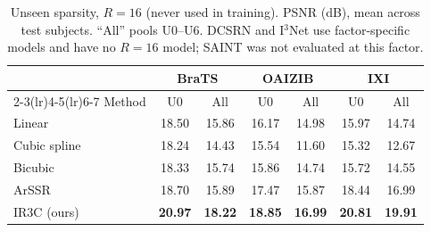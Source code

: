 \begin{table}[pos=t]
\caption{Unseen sparsity, $R=16$ (never used in training). PSNR (dB), mean across test subjects. ``All'' pools U0--U6. DCSRN and I$^3$Net use factor-specific models and have no $R=16$ model; SAINT was not evaluated at this factor.}
\label{tab:r16}
\footnotesize\setlength{\tabcolsep}{3pt}
\begin{tabular*}{\columnwidth}{@{\extracolsep{\fill}}lcccccc@{}}
\toprule
& \multicolumn{2}{c}{BraTS} & \multicolumn{2}{c}{OAIZIB} & \multicolumn{2}{c}{IXI} \\
\cmidrule(lr){2-3}\cmidrule(lr){4-5}\cmidrule(lr){6-7}
Method & U0 & All & U0 & All & U0 & All \\
\midrule
Linear & 18.50 & 15.86 & 16.17 & 14.98 & 15.97 & 14.74 \\
Cubic spline & 18.24 & 14.43 & 15.54 & 11.60 & 15.32 & 12.67 \\
Bicubic & 18.33 & 15.74 & 15.86 & 14.74 & 15.72 & 14.55 \\
ArSSR & 18.70 & 15.89 & 17.47 & 15.87 & 18.44 & 16.99 \\
IR3C (ours) & \textbf{20.97} & \textbf{18.22} & \textbf{18.85} & \textbf{16.99} & \textbf{20.81} & \textbf{19.91} \\
\bottomrule
\end{tabular*}
\end{table}
